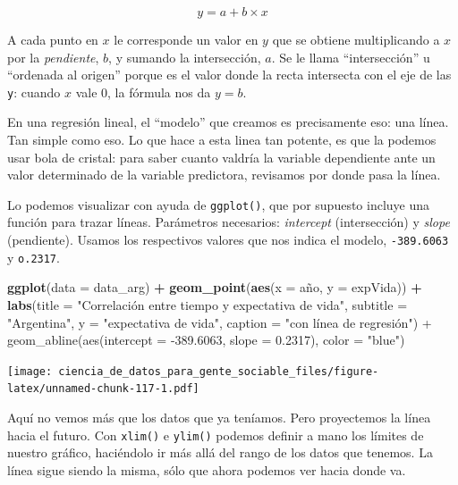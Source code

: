 \documentclass[]{book}
\newenvironment{Shaded}{\begin{snugshade}}{\end{snugshade}}
\newcommand{\KeywordTok}[1]{\textcolor[rgb]{0.13,0.29,0.53}{\textbf{#1}}}
\newcommand{\DataTypeTok}[1]{\textcolor[rgb]{0.13,0.29,0.53}{#1}}
\newcommand{\StringTok}[1]{\textcolor[rgb]{0.31,0.60,0.02}{#1}}
\newcommand{\OperatorTok}[1]{\textcolor[rgb]{0.81,0.36,0.00}{\textbf{#1}}}
\newcommand{\NormalTok}[1]{#1}
\begin{document}
\[ y = a + b \times x \]

A cada punto en \(x\) le corresponde un valor en \(y\) que se obtiene
multiplicando a \(x\) por la \emph{pendiente}, \(b\), y sumando la
intersección, \(a\). Se le llama ``intersección'' u ``ordenada al
origen'' porque es el valor donde la recta intersecta con el eje de las
\texttt{y}: cuando \(x\) vale \(0\), la fórmula nos da \(y = b\).

En una regresión lineal, el ``modelo'' que creamos es precisamente eso:
una línea. Tan simple como eso. Lo que hace a esta linea tan potente, es
que la podemos usar bola de cristal: para saber cuanto valdría la
variable dependiente ante un valor determinado de la variable
predictora, revisamos por donde pasa la línea.

Lo podemos visualizar con ayuda de \texttt{ggplot()}, que por supuesto
incluye una función para trazar líneas. Parámetros necesarios:
\emph{intercept} (intersección) y \emph{slope} (pendiente). Usamos los
respectivos valores que nos indica el modelo, \texttt{-389.6063} y
\texttt{o.2317}.

\begin{Shaded}
\begin{Highlighting}[]
\KeywordTok{ggplot}\NormalTok{(}\DataTypeTok{data =}\NormalTok{ data_arg) }\OperatorTok{+}\StringTok{ }
\StringTok{    }\KeywordTok{geom_point}\NormalTok{(}\KeywordTok{aes}\NormalTok{(}\DataTypeTok{x =}\NormalTok{ año, }\DataTypeTok{y =}\NormalTok{ expVida)) }\OperatorTok{+}
\StringTok{    }\KeywordTok{labs}\NormalTok{(}\DataTypeTok{title =} \StringTok{"Correlación entre tiempo y expectativa de vida"}\NormalTok{,}
         \DataTypeTok{subtitle =} \StringTok{"Argentina"}\NormalTok{,}
         \DataTypeTok{y =} \StringTok{"expectativa de vida"}\NormalTok{,}
         \DataTypeTok{caption =} \StringTok{"con línea de regresión") +}
\StringTok{    geom_abline(aes(intercept = -389.6063, slope = 0.2317), color = "}\NormalTok{blue}\StringTok{")}
\end{Highlighting}
\end{Shaded}

\texttt{[image: ciencia\_de\_datos\_para\_gente\_sociable\_files/figure-latex/unnamed-chunk-117-1.pdf]}

Aquí no vemos más que los datos que ya teníamos. Pero proyectemos la
línea hacia el futuro. Con \texttt{xlim()} e \texttt{ylim()} podemos
definir a mano los límites de nuestro gráfico, haciéndolo ir más allá
del rango de los datos que tenemos. La línea sigue siendo la misma, sólo
que ahora podemos ver hacia donde va.
\end{document}
